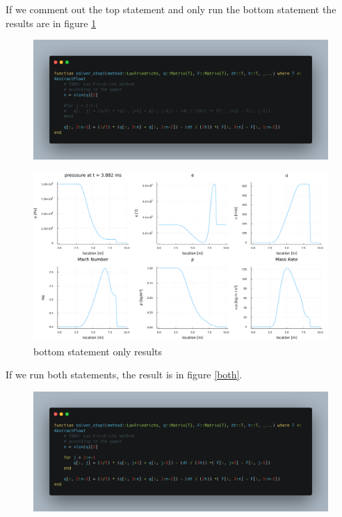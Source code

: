 \documentclass{article}
\begin{document}
If we comment out the top statement and only run the bottom statement the results are in figure \ref{bottom}

\begin{figure}[H]
	\centering
	\includegraphics[width=\textwidth]{./figs/bottom.png}
\end{figure}

\begin{figure}[H]
	\centering
	\includegraphics[width=\textwidth]{./figs/bottom_statement.png}
	\caption{bottom statement only results}
	\label{bottom}
\end{figure}

If we run both statements, the result is in figure \ref{both}.

\begin{figure}[H]
	\centering
	\includegraphics[width=\textwidth]{./figs/both.png}
\end{figure}
\end{document}
